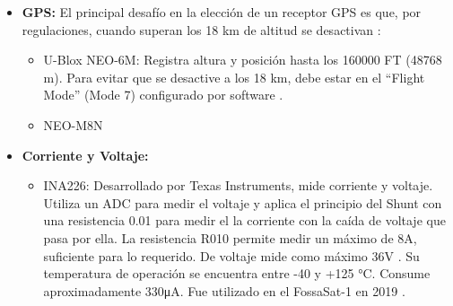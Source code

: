 \documentclass[12pt,a4paper]{article}
\begin{document}
\begin{itemize}
  \begin{itemize}
  \item
    BME280: Con un rango de presión especificado de entre 300 y 1100 hPa \cite{ref9} serviría si solo fuéramos a una altura máxima de 9 km aproximadamente.
  \item
    BMP388: Elaborado por Bosch Sensortec, es una evolución del anterior con mejor precisión, alcanzando valores del orden de ±0,5 hPa. A pesar de esta mejora, su rango de presión sigue comenzando en 300 hPa \cite{ref10}.
  \item
    MS5607: Desarrollado por TE Connectivity, tiene un rango operativo de 10 a 1200 hPa con una precisión de ±1,5. También tiene un sensor de temperatura integrado con rango de −40 a +85 °C. Además, tiene una resolución de altura de 20 cm \cite{ref11}.
  \item
    MS5611: También desarrollado por TE Connectivity, tiene un rango operativo de 10 a 1200 hPa con una precisión de ±1,5. También tiene un sensor de temperatura integrado con rango de −40 a +85 °C. Además, tiene una resolución de altura de 10 cm \cite{ref12}.
  \end{itemize}
\item
  \textbf{GPS:} El principal desafío en la elección de un receptor GPS es que, por regulaciones, cuando superan los 18 km de altitud se desactivan \cite{ref13}:

  \begin{itemize}
  \item
    U-Blox NEO-6M: Registra altura y posición hasta los 160000 FT (48768 m). Para evitar que se desactive a los 18 km, debe estar en el ``Flight Mode'' (Mode 7) configurado por software \cite{ref13}.
  \item
    NEO-M8N
  \end{itemize}
\item
  \textbf{Corriente y Voltaje:}

  \begin{itemize}
  \item
    INA226: Desarrollado por Texas Instruments, mide corriente y voltaje. Utiliza un ADC para medir el voltaje y aplica el principio del Shunt con una resistencia 0.01 para medir el la corriente con la caída de voltaje que pasa por ella. La resistencia R010 permite medir un máximo de 8A, suficiente para lo requerido. De voltaje mide como máximo 36V \cite{ref95}. Su temperatura de operación se encuentra entre -40 y +125 °C. Consume aproximadamente 330μA. Fue utilizado en el FossaSat-1 en 2019 \cite{ref96}.
  \end{itemize}
\end{itemize}
\end{document}
